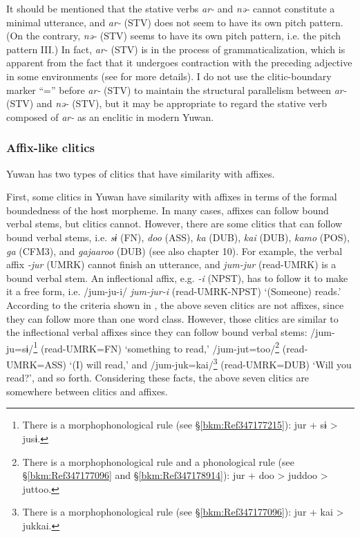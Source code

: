 It should be mentioned that the stative verbs \textit{ar-} and \textit{nə-} cannot constitute a minimal utterance, and \textit{ar-} (STV) does not seem to have its own pitch pattern. (On the contrary, \textit{nə-} (STV) seems to have its own pitch pattern, i.e. the pitch pattern III.) In fact, \textit{ar-} (STV) is in the process of grammaticalization, which is apparent from the fact that it undergoes contraction with the preceding adjective in some environments (see  for more details). I do not use the clitic-boundary marker “=” before \textit{ar-} (STV) to maintain the structural parallelism between \textit{ar-} (STV) and \textit{nə-} (STV), but it may be appropriate to regard the stative verb composed of \textit{ar-} as an enclitic in modern Yuwan.

\subsubsection{Affix-like clitics}\label{sec:4.2.2.2}

Yuwan has two types of clitics that have similarity with affixes.

  First, some clitics in Yuwan have similarity with affixes in terms of the formal boundedness of the host morpheme. In many cases, affixes can follow bound verbal stems, but clitics cannot. However, there are some clitics that can follow bound verbal stems, i.e. \textit{sɨ} (FN), \textit{doo} (ASS), \textit{ka} (DUB), \textit{kai} (DUB), \textit{kamo} (POS), \textit{ga} (CFM3), and \textit{gajaaroo} (DUB) (see also chapter 10). For example, the verbal affix \textit{{}-jur} (UMRK) cannot finish an utterance, and \textit{jum-jur} (read-UMRK) is a bound verbal stem. An inflectional affix, e.g. \textit{{}-i} (NPST), has to follow it to make it a free form, i.e. /jum-ju-i/ \textit{jum-jur-i} (read-UMRK-NPST) ‘(Someone) reads.’ According to the criteria shown in , the above seven clitics are not affixes, since they can follow more than one word class. However, those clitics are similar to the inflectional verbal affixes since they can follow bound verbal stems: /jum-ju=sɨ/\footnote{There is a morphophonological rule (see §\ref{bkm:Ref347177215}): jur + sɨ > jusɨ.} (read-UMRK=FN) ‘something to read,’ /jum-jut=too/\footnote{There is a morphophonological rule and a phonological rule (see §\ref{bkm:Ref347177096} and §\ref{bkm:Ref347178914}): jur + doo > juddoo > juttoo.} (read-UMRK=ASS) ‘(I) will read,’ and /jum-juk=kai/\footnote{There is a morphophonological rule (see §\ref{bkm:Ref347177096}): jur + kai > jukkai.} (read-UMRK=DUB) ‘Will you read?’, and so forth. Considering these facts, the above seven clitics are somewhere between clitics and affixes.

